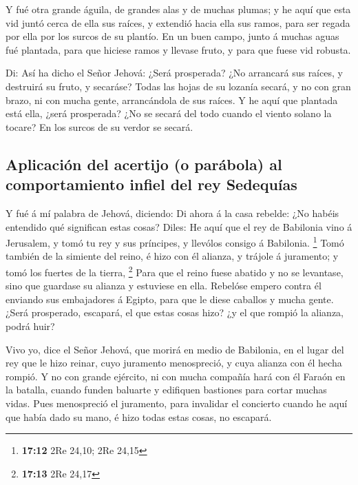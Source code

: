  Y fué otra grande águila, de grandes alas y de muchas
plumas; y he aquí que esta vid juntó cerca de ella sus raíces, y
extendió hacia ella sus ramos, para ser regada por ella por los surcos
de su plantío.  En un buen campo, junto á muchas aguas fué
plantada, para que hiciese ramos y llevase fruto, y para que fuese vid
robusta.

 Di: Así ha dicho el Señor Jehová: ¿Será prosperada? ¿No
arrancará sus raíces, y destruirá su fruto, y secaráse? Todas las hojas
de su lozanía secará, y no con gran brazo, ni con mucha gente,
arrancándola de sus raíces.  Y he aquí que plantada está
ella, ¿será prosperada? ¿No se secará del todo cuando el viento solano
la tocare? En los surcos de su verdor se secará.

\hypertarget{aplicaciuxf3n-del-acertijo-o-paruxe1bola-al-comportamiento-infiel-del-rey-sedequuxedas}{%
\subsection{Aplicación del acertijo (o parábola) al comportamiento
infiel del rey
Sedequías}\label{aplicaciuxf3n-del-acertijo-o-paruxe1bola-al-comportamiento-infiel-del-rey-sedequuxedas}}

 Y fué á mí palabra de Jehová, diciendo:  Di
ahora á la casa rebelde: ¿No habéis entendido qué significan estas
cosas? Diles: He aquí que el rey de Babilonia vino á Jerusalem, y tomó
tu rey y sus príncipes, y llevólos consigo á Babilonia. \footnote{\textbf{17:12}
  2Re 24,10; 2Re 24,15}  Tomó también de la simiente del
reino, é hizo con él alianza, y trájole á juramento; y tomó los fuertes
de la tierra, \footnote{\textbf{17:13} 2Re 24,17}  Para que
el reino fuese abatido y no se levantase, sino que guardase su alianza y
estuviese en ella.  Rebelóse empero contra él enviando sus
embajadores á Egipto, para que le diese caballos y mucha gente. ¿Será
prosperado, escapará, el que estas cosas hizo? ¿y el que rompió la
alianza, podrá huir?

 Vivo yo, dice el Señor Jehová, que morirá en medio de
Babilonia, en el lugar del rey que le hizo reinar, cuyo juramento
menospreció, y cuya alianza con él hecha rompió.  Y no con
grande ejército, ni con mucha compañía hará con él Faraón en la batalla,
cuando funden baluarte y edifiquen bastiones para cortar muchas vidas.
 Pues menospreció el juramento, para invalidar el concierto
cuando he aquí que había dado su mano, é hizo todas estas cosas, no
escapará.

